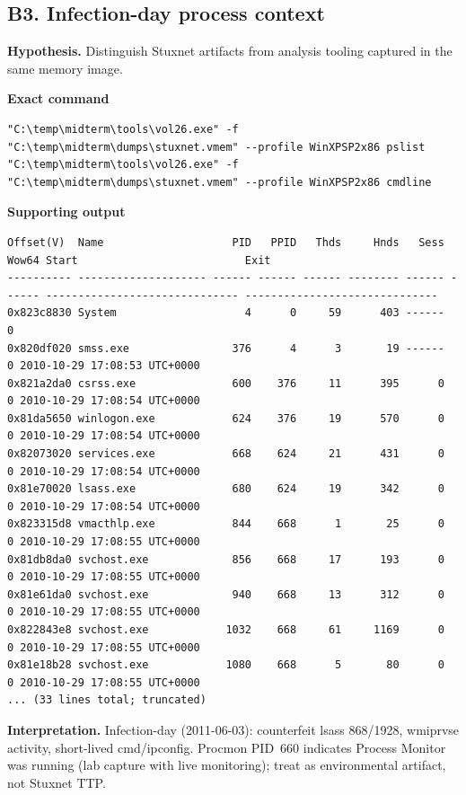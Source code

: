 \documentclass[11pt,letterpaper]{article}
\begin{document}
\subsection*{B3. Infection-day process context}
\textbf{Hypothesis.} Distinguish Stuxnet artifacts from analysis tooling captured in the same memory image.
\par\medskip\noindent\textbf{Exact command}
\begin{lstlisting}
"C:\temp\midterm\tools\vol26.exe" -f "C:\temp\midterm\dumps\stuxnet.vmem" --profile WinXPSP2x86 pslist
"C:\temp\midterm\tools\vol26.exe" -f "C:\temp\midterm\dumps\stuxnet.vmem" --profile WinXPSP2x86 cmdline
\end{lstlisting}
\noindent\textbf{Supporting output}
\begin{lstlisting}
Offset(V)  Name                    PID   PPID   Thds     Hnds   Sess  Wow64 Start                          Exit
---------- -------------------- ------ ------ ------ -------- ------ ------ ------------------------------ ------------------------------
0x823c8830 System                    4      0     59      403 ------      0
0x820df020 smss.exe                376      4      3       19 ------      0 2010-10-29 17:08:53 UTC+0000
0x821a2da0 csrss.exe               600    376     11      395      0      0 2010-10-29 17:08:54 UTC+0000
0x81da5650 winlogon.exe            624    376     19      570      0      0 2010-10-29 17:08:54 UTC+0000
0x82073020 services.exe            668    624     21      431      0      0 2010-10-29 17:08:54 UTC+0000
0x81e70020 lsass.exe               680    624     19      342      0      0 2010-10-29 17:08:54 UTC+0000
0x823315d8 vmacthlp.exe            844    668      1       25      0      0 2010-10-29 17:08:55 UTC+0000
0x81db8da0 svchost.exe             856    668     17      193      0      0 2010-10-29 17:08:55 UTC+0000
0x81e61da0 svchost.exe             940    668     13      312      0      0 2010-10-29 17:08:55 UTC+0000
0x822843e8 svchost.exe            1032    668     61     1169      0      0 2010-10-29 17:08:55 UTC+0000
0x81e18b28 svchost.exe            1080    668      5       80      0      0 2010-10-29 17:08:55 UTC+0000
... (33 lines total; truncated)
\end{lstlisting}
\noindent\textbf{Interpretation.} Infection-day (2011-06-03): counterfeit lsass 868/1928, wmiprvse activity, short-lived cmd/ipconfig. Procmon PID~660 indicates Process Monitor was running (lab capture with live monitoring); treat as environmental artifact, not Stuxnet TTP.
\vspace{0.55em}
\end{document}

